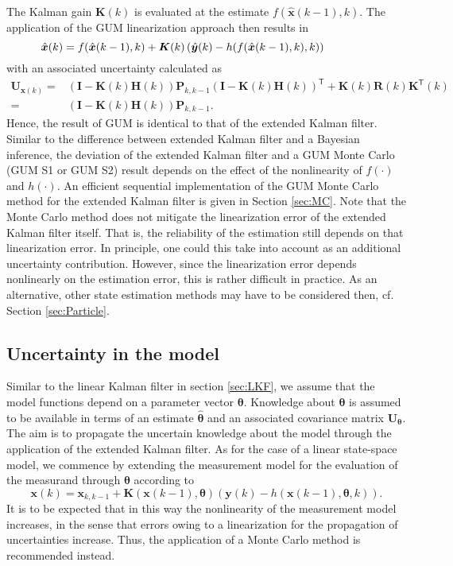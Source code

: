 \documentclass[10pt]{article}
\begin{document}
\begin{spacing}{1}
The Kalman gain $\bm{K}(k)$ is evaluated at the estimate $f(\hat{\bm{x}}(k-1),k)$. The application of the GUM linearization approach then results in
\begin{equation}
\hspace{-10ex} \hat{\bm{x}}(k) = f(\hat{\bm{x}}(k-1),k) + \bm{K}(k)\left( \hat{\bm{y}}(k)-h(f(\hat{\bm{x}}(k-1),k),k) \right)
\end{equation}
with an associated uncertainty calculated as
\begin{align}
 \bm{U}_{\bm{x}(k)} =& \left( \bm{I}-\bm{K}(k)\bm{H}(k) \right)\bm{P}_{k,k-1}\left( \bm{I}-\bm{K}(k)\bm{H}(k) \right)^{\mathsf{T}} + \bm{K}(k)\bm{R}(k)\bm{K}^{\mathsf{T}}(k) \\
		=& \left( \bm{I}-\bm{K}(k)\bm{H}(k) \right)\bm{P}_{k,k-1} .
\end{align}
Hence, the result of GUM is identical to that of the extended Kalman filter. Similar to the difference between extended Kalman filter and a Bayesian inference, the deviation of the extended Kalman filter and a GUM Monte Carlo (GUM S1 or GUM S2) result depends on the effect of the nonlinearity of $f(\cdot)$ and $h(\cdot)$. An efficient sequential implementation of the GUM Monte Carlo method for the extended Kalman filter is given in Section \ref{sec:MC}. Note that the Monte Carlo method does not mitigate the linearization error of the extended Kalman filter itself. That is, the reliability of the estimation still depends on that linearization error. In principle, one could this take into account as an additional uncertainty contribution. However, since the linearization error depends nonlinearly on the estimation error, this is rather difficult in practice. As an alternative, other state estimation methods may have to be considered then, cf. Section \ref{sec:Particle}.


\subsection{Uncertainty in the model}
Similar to the linear Kalman filter in section \ref{sec:LKF}, we assume that the model functions depend on a parameter vector $\bm{\theta}$. Knowledge about $\bm{\theta}$ is assumed to be available in terms of an estimate $\hat{\bm{\theta}}$ and an associated covariance matrix $\bm{U_\theta}$. The aim is to propagate the uncertain knowledge about the model through the application of the extended Kalman filter. As for the case of a linear state-space model, we commence by extending the measurement model for the evaluation of the measurand through $\bm{\theta}$ according to
\begin{equation}
	\bm{x}(k) = \bm{x}_{k,k-1} + \bm{K}(\bm{x}(k-1),\bm{\theta})\left( \bm{y}(k) - h(\bm{x}(k-1),\bm{\theta},k) \right) .
	\label{eq:EKF_model2}
\end{equation} 
It is to be expected that in this way the nonlinearity of the measurement model increases, in the sense that errors owing to a linearization for the propagation of uncertainties increase. Thus, the application of a Monte Carlo method is recommended instead. 


\end{spacing}
\end{document}
